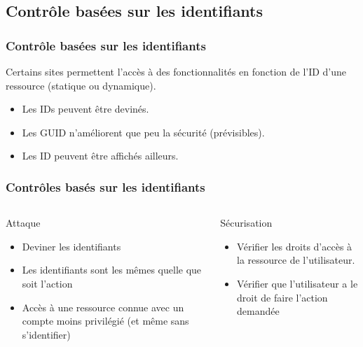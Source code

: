 \documentclass[aspectratio=169]{beamer}  %
\begin{document}
\subsection{Contrôle basées sur les identifiants}
\begin{frame}
  \frametitle{Contrôle basées sur les identifiants}
  Certains sites permettent l'accès à des fonctionnalités en fonction de l'ID d'une ressource (statique ou dynamique).
  \vspace{2em}
  \begin{itemize}
    \item Les IDs peuvent être devinés.
    \item Les GUID n'améliorent que peu la sécurité (prévisibles).
    \item Les ID peuvent être affichés ailleurs.
  \end{itemize}
\end{frame}
\begin{frame}
  \frametitle{Contrôles basés sur les identifiants}
  \begin{columns}[T]
      \begin{alertblock}{Attaque}
        \begin{itemize}
          \item Deviner les identifiants
          \item Les identifiants sont les mêmes quelle que soit l’action
          \item Accès à une ressource connue avec un compte moins privilégié (et même sans s'identifier)
        \end{itemize}
      \end{alertblock}
      \begin{exampleblock}{Sécurisation}
        \begin{itemize}
          \item Vérifier les droits d'accès à la ressource de l'utilisateur.
          \item Vérifier que l'utilisateur a le droit de faire l'action demandée
        \end{itemize}
      \end{exampleblock}
  \end{columns}
\end{frame}
\end{document}
